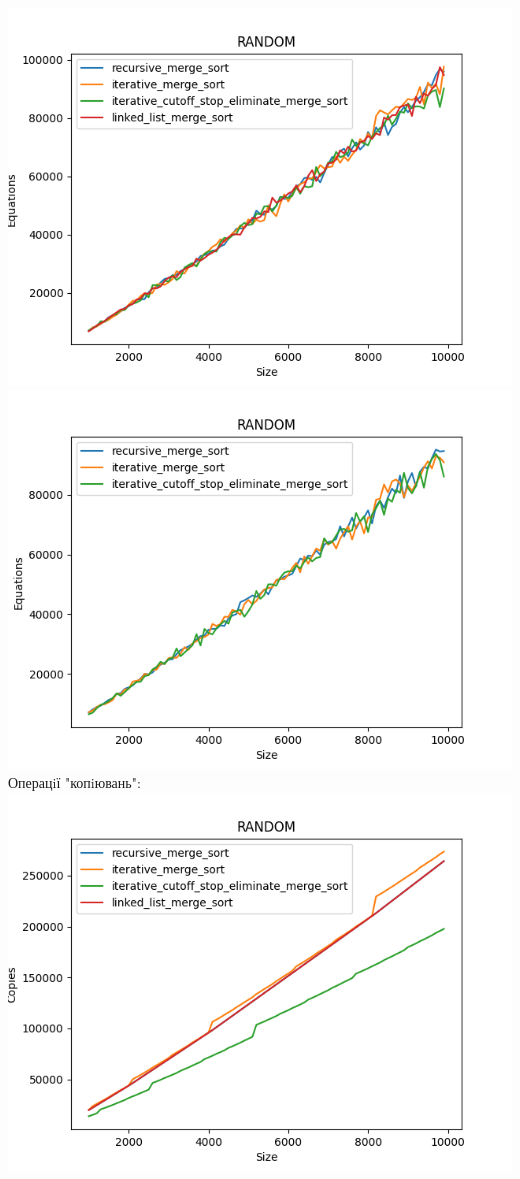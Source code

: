 \documentclass{article}
\begin{document}
            \includegraphics[scale=0.5]{random_Equations_4_sorts_90_numbers_50.png}
            \includegraphics[scale=0.5]{random_Equations_3_sorts_90_numbers_50.png}
        \newpage
        Операцiї "копiювань":
        \newline
            \includegraphics[scale=0.5]{random_Copies_4_sorts_90_numbers_50.png}
\end{document}
